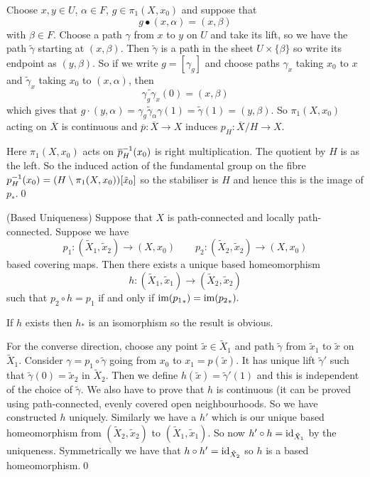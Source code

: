\documentclass{article}
\begin{document}
Choose $ x,y\in U $, $ \alpha\in F $, $ g\in \pi_1(X,x_0) $ and suppose that
\[
  g \bullet (x,\alpha) = (x, \beta)
\]
with $ \beta \in F $.  Choose a path $ \gamma $ from $ x $ to $ y $ on $ U $ and take its lift, so we have the path $ \tilde \gamma $ starting at $ (x,\beta) $. Then $ \tilde \gamma $ is a path in the sheet $ U\times \{\beta\} $ so write its endpoint as $ (y,\beta) $. So if we write $ g = [\gamma_g] $ and choose paths $ \gamma_x $ taking $ x_0 $ to $ x $ and $ \tilde\gamma_x $ taking $ x_0 $ to $ (x,\alpha) $, then 
\[
	\widetilde{\gamma_g\gamma_x}(0) = (x,\beta)
\]
which gives that $ g\cdot(y,\alpha) = \widetilde{\gamma_g\gamma_\alpha\gamma}(1) = \tilde \gamma(1) = (y,\beta) $. So $ \pi_1(X,x_0) $ acting on $ \overline X $ is continuous and $ \overline p:\overline X\to X $ induces $ p_H: \overline X/H \to X $.\par
Here $ \pi_1(X,x_0) $ acts on $ {\overline p}^{-1}_H(x_0) $ is right multiplication. The quotient by $ H $ is as the left. So the induced action of the fundamental group on the fibre $ {p}^{-1}_H(x_0) = (H\setminus \pi_1(X,x_0))[\tilde x_0] $ so the stabiliser is $ H $ and hence this is the image of $ p_* $.\qed
\begin{proposition}
	(Based Uniqueness) Suppose that $ X $ is path-connected and locally path-connected. Suppose we have
	\[
	  p_1: (\tilde X_1,\tilde x_2) \to (X,x_0) \qquad p_2:(\tilde X_2,\tilde x_2) \to (X,x_0)
	\]
	based covering maps. Then there exists a unique based homeomorphism 
	\[
	  h: (\tilde X_1, \tilde x_1) \to (\tilde X_2, \tilde x_2)
	\]
	such that $ p_2\circ h = p_1 $ if and only if $ \operatorname{im}({p_1}_*) = \operatorname{im}({p_2}_*). $
\end{proposition}
\pf If $ h $ exists then $ h_* $ is an isomorphism so the result is obvious.\par
For the converse direction, choose any point $ \tilde x \in \tilde X_1 $ and path $ \tilde \gamma $ from $ \tilde x_1 $ to $ \tilde x $ on $ \tilde X_1 $. Consider $ \gamma = p_1 \circ \tilde \gamma $ going from $ x_0 $ to $ x_1 = p(\tilde x) $. It has unique lift $ \tilde \gamma' $ such that $ \tilde \gamma(0) = \tilde x_2 $ in $ \tilde X_2 $. Then we define $ h(\tilde x) = \tilde \gamma'(1) $ and this is independent of the choice of $ \tilde\gamma $. We also have to prove that $ h $ is continuous (it can be proved using path-connected, evenly covered open neighbourhoods. So we have constructed $ h $ uniquely. Similarly we have a $ h' $ which is our unique based homeomorphism from $ (\tilde X_2, \tilde x_2) $ to $ (\tilde X_1,\tilde x_1) $. So now $ h'\circ h = \mathrm{id}_{\tilde X_1} $ by the uniqueness. Symmetrically we have that $ h\circ h'  = \mathrm{id}_{\tilde X_2} $ so $ h $ is a based homeomorphism.\qed
\end{document}
